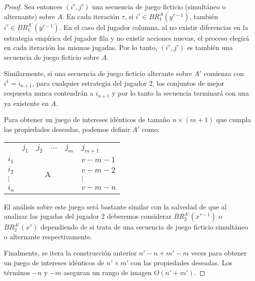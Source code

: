 \begin{proof}
    Sea entonces $(i^\tau, j^\tau)$ una secuencia de juego ficticio (simultáneo o alternante) sobre $A$. En cada iteración $\tau$, si $i^\tau \in BR_1^A(y^{\tau-1})$, también $i^\tau \in BR_1^{A'}(y^{\tau-1})$. En el caso del jugador columna, al no existir diferencias en la estrategia empírica del jugador fila y no existir acciones nuevas, el proceso elegirá en cada iteración las mismas jugadas. Por lo tanto, $(i^\tau, j^\tau)$ es también una secuencia de juego ficticio sobre $A$.

    Similarmente, si una secuencia de juego ficticio alterante sobre $A'$ comienza con $i^1 = i_{n+1}$, para cualquier estrategia del jugador 2, los conjuntos de mejor respuesta nunca contendrán a $i_{n+1}$ y por lo tanto la secuencia terminará con una ya existente en $A$.

    Para obtener un juego de intereses idénticos de tamaño $n \times (m+1)$ que cumpla las propiedades deseadas, podemos definir $A'$ como:

    \begin{center}
        \begin{tabular}{lcllll}
                                    & \multicolumn{1}{l}{$j_1$} & $j_2$ & $\dots$ & $j_m$ & $j_{m+1}$                        \\ \cline{2-6} 
        \multicolumn{1}{l|}{$i_1$}    & \multicolumn{4}{c|}{\multirow{4}{*}{\huge A}}       & \multicolumn{1}{l|}{$v - m - 1$} \\
        \multicolumn{1}{l|}{$i_2$}    & \multicolumn{4}{c|}{}                               & \multicolumn{1}{l|}{$v - m - 2$} \\
        \multicolumn{1}{l|}{$\vdots$} & \multicolumn{4}{c|}{}                               & \multicolumn{1}{l|}{$\vdots$}    \\
        \multicolumn{1}{l|}{$i_n$}    & \multicolumn{4}{c|}{}                               & \multicolumn{1}{l|}{$v - m - n$} \\ \cline{2-6} 
        \end{tabular}
    \end{center}
    
    El análisis sobre este juego será bastante similar con la salvedad de que al analizar las jugadas del jugador 2 deberemos considerar $BR_2^{A'}(x^{\tau-1})$ o $BR_2^{A'}(x^\tau)$ dependiendo de si trata de una secuencia de juego ficticio simultáneo o alternante respectivamente.

    Finalmente, se itera la construcción anterior $n'-n+m'-m$ veces para obtener un juego de intereses idénticos de $n'\times m'$ con las propiedades deseadas.
    Los términos $-n$ y $-m$ aseguran un rango de imagen $O(n'+m')$.

\end{proof}

